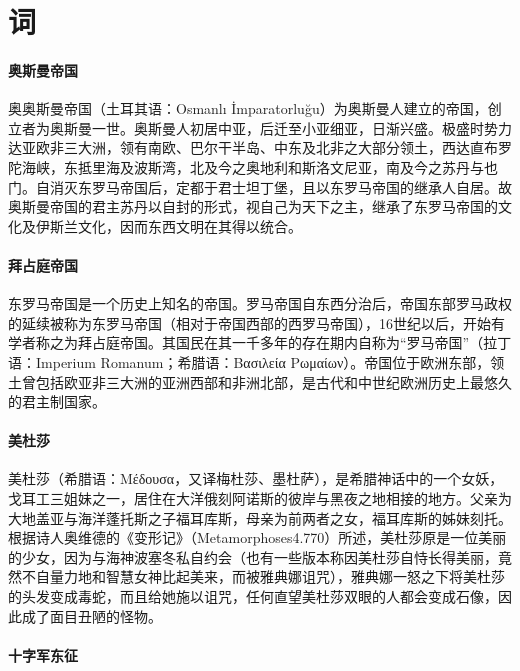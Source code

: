 \documentclass[letter]{book}
\begin{document}
\section{词}


\paragraph{奥斯曼帝国}

奥奥斯曼帝国（土耳其语：Osmanlı İmparatorluğu）为奥斯曼人建立的帝国，创立者为奥斯曼一世。奥斯曼人初居中亚，后迁至小亚细亚，日渐兴盛。极盛时势力达亚欧非三大洲，领有南欧、巴尔干半岛、中东及北非之大部分领土，西达直布罗陀海峡，东抵里海及波斯湾，北及今之奥地利和斯洛文尼亚，南及今之苏丹与也门。自消灭东罗马帝国后，定都于君士坦丁堡，且以东罗马帝国的继承人自居。故奥斯曼帝国的君主苏丹以自封的形式，视自己为天下之主，继承了东罗马帝国的文化及伊斯兰文化，因而东西文明在其得以统合。


\paragraph{拜占庭帝国}

东罗马帝国是一个历史上知名的帝国。罗马帝国自东西分治后，帝国东部罗马政权的延续被称为东罗马帝国（相对于帝国西部的西罗马帝国），16世纪以后，开始有学者称之为拜占庭帝国。其国民在其一千多年的存在期内自称为“罗马帝国”（拉丁语：Imperium Romanum；希腊语：Βασιλεία Ρωμαίων）。帝国位于欧洲东部，领土曾包括欧亚非三大洲的亚洲西部和非洲北部，是古代和中世纪欧洲历史上最悠久的君主制国家。


\paragraph{美杜莎}

美杜莎（希腊语：Μέδουσα，又译梅杜莎、墨杜萨），是希腊神话中的一个女妖，戈耳工三姐妹之一，居住在大洋俄刻阿诺斯的彼岸与黑夜之地相接的地方。父亲为大地盖亚与海洋蓬托斯之子福耳库斯，母亲为前两者之女，福耳库斯的姊妹刻托。根据诗人奥维德的《变形记》（Metamorphoses4.770）所述，美杜莎原是一位美丽的少女，因为与海神波塞冬私自约会（也有一些版本称因美杜莎自恃长得美丽，竟然不自量力地和智慧女神比起美来，而被雅典娜诅咒），雅典娜一怒之下将美杜莎的头发变成毒蛇，而且给她施以诅咒，任何直望美杜莎双眼的人都会变成石像，因此成了面目丑陋的怪物。

\paragraph{十字军东征}
\end{document}
